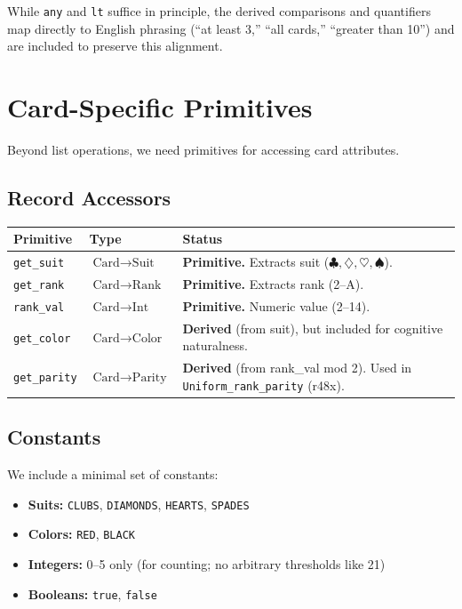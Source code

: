 \documentclass[11pt]{article}
\begin{document}
While \texttt{any} and \texttt{lt} suffice in principle, the derived comparisons and quantifiers map directly to English phrasing (``at least 3,'' ``all cards,'' ``greater than 10'') and are included to preserve this alignment.

\section{Card-Specific Primitives}

Beyond list operations, we need primitives for accessing card attributes.

\subsection{Record Accessors}

\begin{center}
\begin{tabular}{llp{7cm}}
\toprule
\textbf{Primitive} & \textbf{Type} & \textbf{Status} \\
\midrule
\texttt{get\_suit} & $\text{Card} \to \text{Suit}$ & \textbf{Primitive.} Extracts suit ($\clubsuit, \diamondsuit, \heartsuit, \spadesuit$). \\
\texttt{get\_rank} & $\text{Card} \to \text{Rank}$ & \textbf{Primitive.} Extracts rank (2--A). \\
\texttt{rank\_val} & $\text{Card} \to \text{Int}$ & \textbf{Primitive.} Numeric value (2--14). \\
\texttt{get\_color} & $\text{Card} \to \text{Color}$ & \textbf{Derived} (from suit), but included for cognitive naturalness. \\
\texttt{get\_parity} & $\text{Card} \to \text{Parity}$ & \textbf{Derived} (from rank\_val mod 2). Used in \texttt{Uniform\_rank\_parity} (r48x). \\
\bottomrule
\end{tabular}
\end{center}

\subsection{Constants}

We include a minimal set of constants:

\begin{itemize}
    \item \textbf{Suits:} \texttt{CLUBS}, \texttt{DIAMONDS}, \texttt{HEARTS}, \texttt{SPADES}
    \item \textbf{Colors:} \texttt{RED}, \texttt{BLACK}
    \item \textbf{Integers:} 0--5 only (for counting; no arbitrary thresholds like 21)
    \item \textbf{Booleans:} \texttt{true}, \texttt{false}
\end{itemize}
\end{document}
